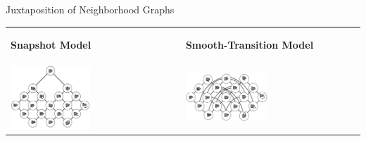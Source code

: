 	
	\begin{frame}{Juxtaposition of Neighborhood Graphs}
		\begin{tabularx}{\textwidth}{XX}
			\begin{center}
				\textbf{Snapshot Model}
			\end{center}
			&
			\begin{center}
			\textbf{Smooth-Transition Model}
			\end{center} \\
			\includegraphics[width=0.48\textwidth]{images/snapshot_model_neighborhood_graph_simple.png}
			&
			\includegraphics[width=0.48\textwidth]{images/smooth_transitions_neighborhood_graph.png}
		\end{tabularx}
	\end{frame}
	

